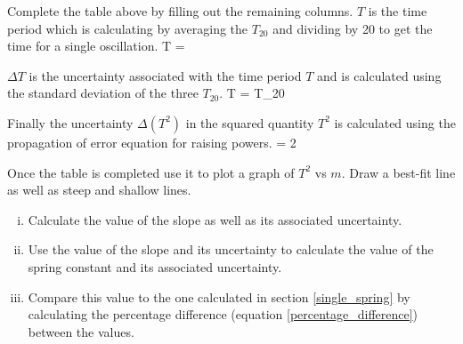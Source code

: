         Complete the table above by filling out the remaining columns. $T$ is the time period which is calculating by averaging the $T_{20}$ and dividing by 20 to get the time for a single oscillation.
        \beq
            T = 
        \eeq

        $\Delta T$ is the uncertainty associated with the time period $T$ and is calculated using the standard deviation of the three $T_{20}$.
        \beq
            \Delta T =  \Delta T_{20}
        \eeq

        Finally the uncertainty $\Delta (T^2)$ in the squared quantity $T^2$ is calculated using the propagation of error equation for raising powers.
        \beq
             = 2 
        \eeq

        Once the table is completed use it to plot a graph of $T^2$ vs $m$. Draw a best-fit line as well as steep and shallow lines.

        \begin{enumerate}[(i)]

            \item Calculate the value of the slope as well as its associated uncertainty.

            \item Use the value of the slope and its uncertainty to calculate the value of the spring constant and its associated uncertainty.

            \item Compare this value to the one calculated in section \ref{single_spring} by calculating the percentage difference (equation \eqref{percentage_difference}) between the values.

        \end{enumerate}
